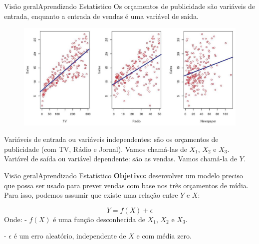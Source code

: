 \documentclass[t]{beamer}
\begin{document}
\begin{ftst}{Visão geral}{{Aprendizado Estatístico}}
\justifying
Os orçamentos de publicidade são variáveis de entrada, enquanto a entrada de vendas é uma variável de saída.

\begin{figure}
    \centering
    \includegraphics[scale=0.7]{Figuras/slide03_04.jpg}
\end{figure}
\small
Variáveis de entrada ou variáveis independentes: são os orçamentos de publicidade (com TV, Rádio e Jornal). Vamos chamá-las de $X_1$, $X_2$ e $X_3$.
\vone
Variável de saída ou variável dependente: são as vendas. Vamos chamá-la de $Y$.
\end{ftst}


\begin{ftst}{Visão geral}{{Aprendizado Estatístico}}
\justifying
\textbf{Objetivo:} desenvolver um modelo preciso que possa ser usado para prever vendas com base nos três orçamentos de mídia.
\vone
Para isso, podemos assumir que existe uma relação entre $Y$ e $X$:

\vone
\begin{equation}
    Y = f(X) + \epsilon
\end{equation}
\vone
Onde:
\vone
- $f(X)$ é uma função desconhecida de $X_1$, $X_2$ e $X_3$.

- $\epsilon$ é um erro aleatório, independente de $X$ e com média zero.
\end{ftst}

\end{document}
